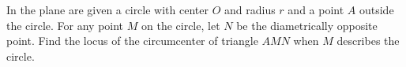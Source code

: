 In the plane are given a circle with center $ O$ and radius $ r$ and a point $ A$ outside the circle. For any point $ M$ on the circle, let $ N$ be the diametrically opposite point. Find the locus of the circumcenter of triangle $ AMN$ when $ M$ describes the circle.